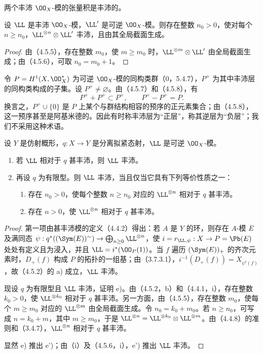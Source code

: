 两个丰沛 $\OO_X$-模的张量积是丰沛的。

设 $\LL$ 是丰沛 $\OO_X$-模，$\LL'$ 是可逆 $\OO_X$-模。则存在整数 $n_0>0$，使对每个 $n\geq n_0$，$\LL^{\otimes n}\otimes\LL'$ 丰沛，且由其全局截面生成。
\begin{proof}
由（4.5.5），存在整数 $m_0$，使 $m\geq m_0$ 时，$\LL^{\otimes m}\otimes\LL'$ 由全局截面生成；由（4.5.6），可取 $n_0=m_0+1$。
\end{proof}

令 $P=H^1(X,\OO_X^*)$ 为可逆 $\OO_X$-模的同构类群（0，5.4.7），$P^+$ 为其中丰沛层的同构类构成的子集。设 $P^+\ne\varnothing$。由（4.5.7）和（4.5.8），有
\[
P^++P^+\subset P^+,
\qquad P^+-P^+=P.
\]
换言之，$P^+\cup\{0\}$ 是 $P$ 上某个与群结构相容的预序的正元素集合；由（4.5.8），这一预序甚至是阿基米德的。因此有时称丰沛层为“正层”，称其逆层为“负层”；我们不采用这种术语。

设 $Y$ 是仿射概形，$q:X\to Y$ 是分离拟紧态射，$\LL$ 是可逆 $\OO_X$-模。
\begin{enumerate}[label=\textup{(\roman*)}]
\item 若 $\LL$ 相对于 $q$ 甚丰沛，则 $\LL$ 丰沛。
\item 再设 $q$ 为有限型。则 $\LL$ 丰沛，当且仅当它具有下列等价性质之一：
\begin{enumerate}[label=\textup{e)}]
\item 存在 $n_0>0$，使每个整数 $n\geq n_0$ 对应的 $\LL^{\otimes n}$ 相对于 $q$ 甚丰沛。
\item[\textup{e')}] 存在 $n>0$，使 $\LL^{\otimes n}$ 相对于 $q$ 甚丰沛。
\end{enumerate}
\end{enumerate}
\begin{proof}
第一项由甚丰沛模的定义（4.4.2）得出：若 $A$ 是 $Y$ 的环，则存在 $A$-模 $E$ 及满同态
$\psi:q^*((\Sym(E))^{\sim})\to\bigoplus_{n\geq0}\LL^{\otimes n}$，使 $i=r_{\LL,\psi}:X\to P=\Pb(E)$ 处处有定义且为浸入，并且 $\LL=i^*(\OO_P(1))$。当 $f$ 遍历 $(\Sym(E))_+$ 的齐次元素时，$D_+(f)$ 构成 $P$ 的拓扑的一组基；由（3.7.3.1），$i^{-1}(D_+(f))=X_{\psi^\flat(f)}$，故（4.5.2）的 a) 成立，$\LL$ 丰沛。

现设 $q$ 为有限型且 $\LL$ 丰沛，证明 e)。由（4.5.2，b）和（4.4.1，i），存在整数 $k_0>0$，使 $\LL^{\otimes k_0}$ 相对于 $q$ 甚丰沛。另一方面，由（4.5.5），存在整数 $m_0$，使每个 $m\geq m_0$ 对应的 $\LL^{\otimes m}$ 由全局截面生成。令 $n_0=k_0+m_0$。若 $n\geq n_0$，可写成 $n=k_0+m$，其中 $m\geq m_0$，于是
$\LL^{\otimes n}=\LL^{\otimes k_0}\otimes\LL^{\otimes m}$。由（4.4.8）的准则和（3.4.7），$\LL^{\otimes n}$ 相对于 $q$ 甚丰沛。

显然 e) 推出 e')；由（i）及（4.5.6，i），e') 推出 $\LL$ 丰沛。
\end{proof}

